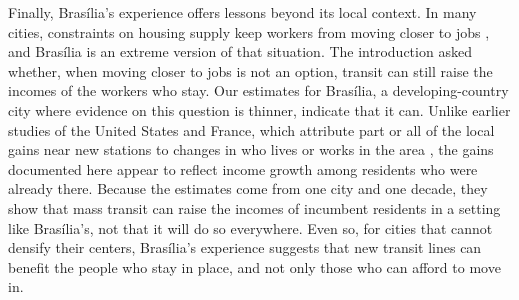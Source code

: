 Finally, Brasília's experience offers lessons beyond its local context. In many cities, constraints on housing supply keep workers from moving closer to jobs \citep{glaeser2018economic}, and Brasília is an extreme version of that situation. The introduction asked whether, when moving closer to jobs is not an option, transit can still raise the incomes of the workers who stay. Our estimates for Brasília, a developing-country city where evidence on this question is thinner, indicate that it can. Unlike earlier studies of the United States and France, which attribute part or all of the local gains near new stations to changes in who lives or works in the area \citep{heilmann2018transit, mayertrevien2017largescale, tyndall2021local}, the gains documented here appear to reflect income growth among residents who were already there. Because the estimates come from one city and one decade, they show that mass transit can raise the incomes of incumbent residents in a setting like Brasília's, not that it will do so everywhere. Even so, for cities that cannot densify their centers, Brasília's experience suggests that new transit lines can benefit the people who stay in place, and not only those who can afford to move in.

